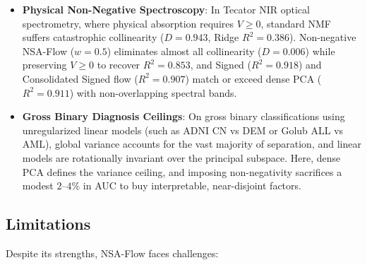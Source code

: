 \documentclass[
]{article}
\begin{document}
\begin{itemize}
\item
  \textbf{Physical Non-Negative Spectroscopy}: In Tecator NIR optical spectrometry, where physical absorption requires \(V \ge 0\), standard NMF suffers catastrophic collinearity (\(D = 0.943\), Ridge \(R^2 = 0.386\)). Non-negative NSA-Flow (\(w=0.5\)) eliminates almost all collinearity (\(D = 0.006\)) while preserving \(V \ge 0\) to recover \(R^2 = 0.853\), and Signed (\(R^2 = 0.918\)) and Consolidated Signed flow (\(R^2 = 0.907\)) match or exceed dense PCA (\(R^2 = 0.911\)) with non-overlapping spectral bands.
\item
  \textbf{Gross Binary Diagnosis Ceilings}: On gross binary classifications using unregularized linear models (such as ADNI CN vs DEM or Golub ALL vs AML), global variance accounts for the vast majority of separation, and linear models are rotationally invariant over the principal subspace. Here, dense PCA defines the variance ceiling, and imposing non-negativity sacrifices a modest \(2\)--\(4\%\) in AUC to buy interpretable, near-disjoint factors.
\end{itemize}

\subsection{Limitations}\label{limitations}

Despite its strengths, NSA-Flow faces challenges:
\end{document}
